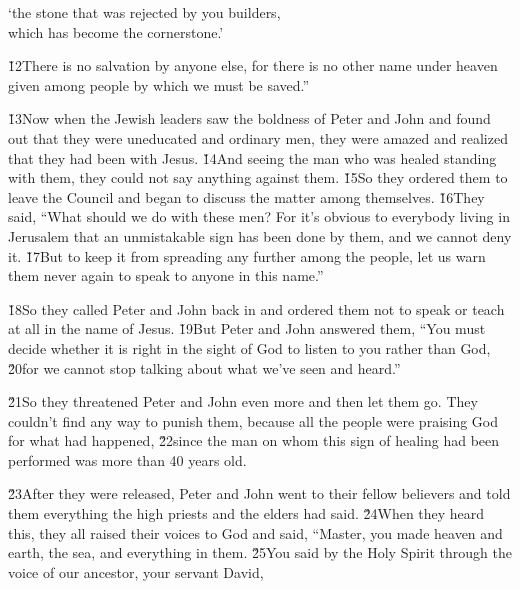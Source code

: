 \begin{poetry}
\poeml `the stone that was rejected by you builders, \\
\poemll    which has become the cornerstone.'
\end{poetry}

\v{12}There is no salvation by anyone else, for there is no other name under heaven given among people by which we must be saved.''

\v{13}Now when the Jewish leaders saw the boldness of Peter and John and found out that they were uneducated and ordinary men, they were amazed and realized that they had been with Jesus. \v{14}And seeing the man who was healed standing with them, they could not say anything against them. \v{15}So they ordered them to leave the Council and began to discuss the matter among themselves. \v{16}They said, ``What should we do with these men? For it's obvious to everybody living in Jerusalem that an unmistakable sign has been done by them, and we cannot deny it. \v{17}But to keep it from spreading any further among the people, let us warn them never again to speak to anyone in this name.''

\v{18}So they called Peter and John back in and ordered them not to speak or teach at all in the name of Jesus. \v{19}But Peter and John answered them, ``You must decide whether it is right in the sight of God to listen to you rather than God, \v{20}for we cannot stop talking about what we've seen and heard.''

\v{21}So they threatened Peter and John even more and then let them go. They couldn't find any way to punish them, because all the people were praising God for what had happened, \v{22}since the man on whom this sign of healing had been performed was more than 40 years old.

\v{23}After they were released, Peter and John went to their fellow believers and told them everything the high priests and the elders had said. \v{24}When they heard this, they all raised their voices to God and said, ``Master, you made heaven and earth, the sea, and everything in them. \v{25}You said by the Holy Spirit through the voice of our ancestor, your servant David,

